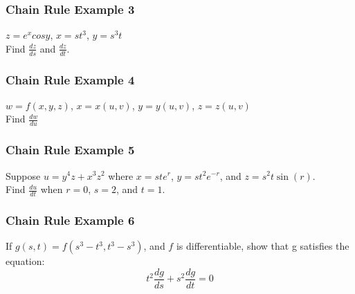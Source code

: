 \documentclass[12pt]{article}
\begin{document}
\subsubsection{Chain Rule Example 3}
\(z=e^xcosy\),	\(x=st^3\), \(y=s^3t\)\\
Find \(\frac{dz}{ds}\) and \(\frac{dz}{dt}\).

\subsubsection{Chain Rule Example 4}
\(w=f(x,y,z)\), \(x=x(u,v)\), \(y=y(u,v)\), \(z=z(u,v)\)\\
Find \(\frac{dw}{du}\)

\subsubsection{Chain Rule Example 5}
Suppose \(u=y^4z + x^3z^2\) where \(x=ste^r\), \(y = st^2e^{-r}\), and \(z=s^2t\sin(r)\). \\
Find \(\frac{du}{dt}\) when \(r=0\), \(s=2\), and \(t=1\).

\subsubsection{Chain Rule Example 6}
If \(g(s,t) = f(s^3 - t^3, t^3 - s^3)\), and \(f\) is differentiable, show that g satisfies the equation:
\[
	t^2 \frac{dg}{ds} + s^2 \frac{dg}{dt} = 0
\]
\end{document}
